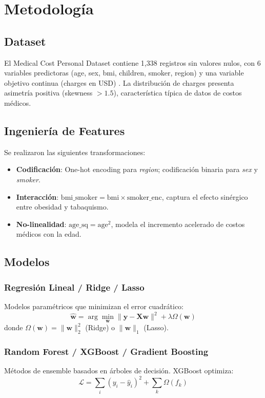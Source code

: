 \section{Metodología}

\subsection{Dataset}
El Medical Cost Personal Dataset contiene 1,338 registros sin valores
nulos, con 6 variables predictoras (age, sex, bmi, children, smoker,
region) y una variable objetivo continua (charges en USD) \cite{insuranceKaggle}.
La distribución de charges presenta asimetría positiva (skewness $> 1.5$),
característica típica de datos de costos médicos.

\subsection{Ingeniería de Features}
Se realizaron las siguientes transformaciones:
\begin{itemize}
  \item \textbf{Codificación}: One-hot encoding para \textit{region};
        codificación binaria para \textit{sex} y \textit{smoker}.
  \item \textbf{Interacción}: $\text{bmi\_smoker} = \text{bmi} \times \text{smoker\_enc}$,
        captura el efecto sinérgico entre obesidad y tabaquismo.
  \item \textbf{No-linealidad}: $\text{age\_sq} = \text{age}^2$, modela
        el incremento acelerado de costos médicos con la edad.
\end{itemize}

\subsection{Modelos}

\subsubsection{Regresión Lineal / Ridge / Lasso}
Modelos paramétricos que minimizan el error cuadrático:
\begin{equation}
\hat{\mathbf{w}} = \arg\min_{\mathbf{w}} \|\mathbf{y} - \mathbf{X}\mathbf{w}\|^2 + \lambda\Omega(\mathbf{w})
\end{equation}
donde $\Omega(\mathbf{w}) = \|\mathbf{w}\|_2^2$ (Ridge) o $\|\mathbf{w}\|_1$ (Lasso).

\subsubsection{Random Forest / XGBoost / Gradient Boosting}
Métodos de ensemble basados en árboles de decisión. XGBoost optimiza:
\begin{equation}
\mathcal{L} = \sum_i (y_i - \hat{y}_i)^2 + \sum_k \Omega(f_k)
\end{equation}

